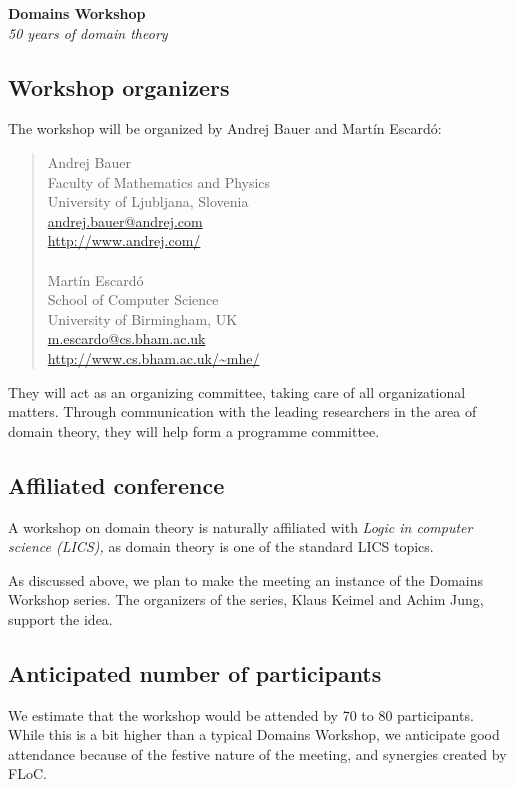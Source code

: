 \documentclass{article}
\begin{document}
\begin{center}
\large
\textbf{Domains Workshop}\\
\emph{50 years of domain theory}
\end{center}

\subsection{Workshop organizers}

The workshop will be organized by Andrej Bauer and Martín Escardó:
%
\begin{quote}
Andrej Bauer \\
Faculty of Mathematics and Physics \\
University of Ljubljana, Slovenia \\
\url{andrej.bauer@andrej.com} \\
\url{http://www.andrej.com/} \\
~ \\
Martín Escardó \\
School of Computer Science \\
University of Birmingham, UK \\
\url{m.escardo@cs.bham.ac.uk} \\
\url{http://www.cs.bham.ac.uk/~mhe/}
\end{quote}

\noindent %
They will act as an organizing committee, taking care of all organizational matters.
Through communication with the leading researchers in the area of domain theory, they will
help form a programme committee.

\subsection{Affiliated conference}

A workshop on domain theory is naturally affiliated with \emph{Logic in computer science
  (LICS),} as domain theory is one of the standard LICS topics.

As discussed above, we plan to make the meeting an instance of
the Domains Workshop series. The organizers of the series, Klaus
Keimel and Achim Jung, support the idea. 

\subsection{Anticipated number of participants}
\label{sec:antic-numb-part}

We estimate that the workshop would be attended by 70 to 80 participants. While this is a
bit higher than a typical Domains Workshop, we anticipate good attendance because of the
festive nature of the meeting, and synergies created by FLoC.
\end{document}
